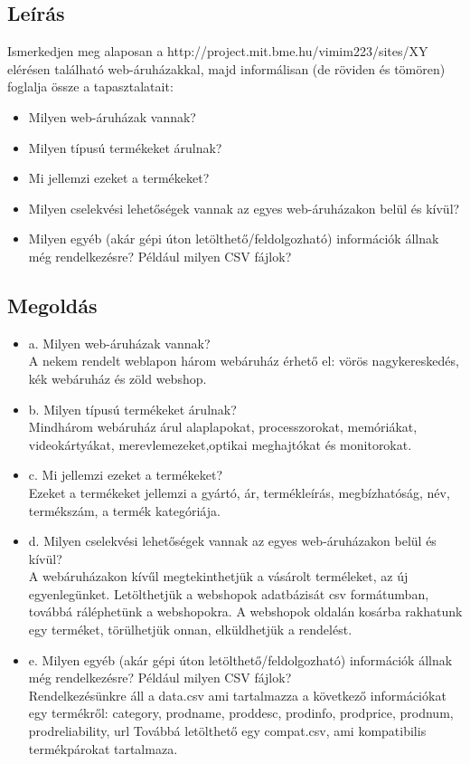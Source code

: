 \subsection{Leírás}
Ismerkedjen meg alaposan a http://project.mit.bme.hu/vimim223/sites/XY elérésen található web-áruházakkal, majd informálisan (de röviden és tömören) foglalja össze a tapasztalatait:
\begin{itemize}
\item Milyen web-áruházak vannak? 
\item Milyen típusú termékeket árulnak? 
\item Mi jellemzi ezeket a termékeket? 
\item Milyen cselekvési lehetőségek vannak az egyes web-áruházakon belül és kívül? 
\item Milyen egyéb (akár gépi úton letölthető/feldolgozható) információk állnak még rendelkezésre? Például milyen CSV fájlok? 
\end{itemize}
\subsection{Megoldás}
\begin{itemize}
\item a. Milyen web-áruházak vannak? \\
A nekem rendelt weblapon három webáruház érhető el: vörös nagykereskedés, kék webáruház és zöld webshop. 
\item b. Milyen típusú termékeket árulnak? \\
Mindhárom webáruház árul alaplapokat, processzorokat, memóriákat, videokártyákat, merevlemezeket,optikai meghajtókat és monitorokat.
\item c. Mi jellemzi ezeket a termékeket? \\
Ezeket a termékeket jellemzi a gyártó, ár, termékleírás, megbízhatóság, név, termékszám, a termék kategóriája.
\item d. Milyen cselekvési lehetőségek vannak az egyes web-áruházakon belül és kívül? \\
A webáruházakon kívűl megtekinthetjük a vásárolt terméleket, az új egyenlegünket. Letölthetjük a webshopok adatbázisát csv formátumban, továbbá ráléphetünk a webshopokra.
A webshopok oldalán kosárba rakhatunk egy terméket, törülhetjük onnan, elküldhetjük a rendelést.
\item e. Milyen egyéb (akár gépi úton letölthető/feldolgozható) információk állnak még rendelkezésre? Például milyen CSV fájlok? \\
Rendelkezésünkre áll a data.csv ami tartalmazza a következő információkat egy termékről: category, prodname, proddesc, prodinfo, prodprice, prodnum, prodreliability, url
Továbbá letölthető egy compat.csv, ami kompatibilis termékpárokat tartalmaza.
\end{itemize}

